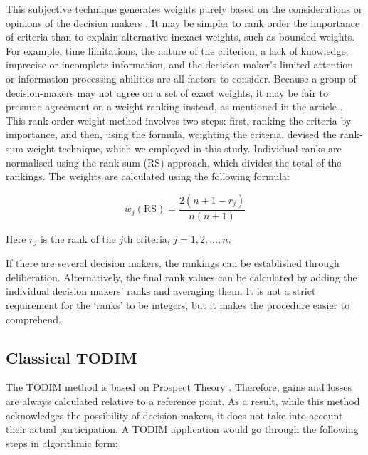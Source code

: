 \documentclass{infor}
\theoremstyle{remark}
\begin{document}
This subjective technique generates weights purely based on the considerations or opinions of the decision makers \citep{zoraghi2013fuzzy}. It may be simpler to rank order the importance of criteria than to explain alternative inexact weights, such as bounded weights. For example, time limitations, the nature of the criterion, a lack of knowledge, imprecise or incomplete information, and the decision maker’s limited attention or information processing abilities are all factors to consider. Because a group of decision-makers may not agree on a set of exact weights, it may be fair to presume agreement on a weight ranking instead, as mentioned in the article \cite{roszkowska2013rank}. This rank order weight method involves two steps: first, ranking the criteria by importance, and then, using the formula, weighting the criteria. \cite{stillwell1981comparison} devised the rank-sum weight technique, which we employed in this study. Individual ranks are normalised using the rank-sum (RS) approach, which divides the total of the rankings. The weights are calculated using the following formula:

\begin{equation}
\label{eqn:rankSumWeights}
w_{j}\left( \text{RS} \right) = \frac{2\left(n + 1 - r_j \right)}{n\left( n + 1 \right)}
\end{equation}

Here \(r_j\) is the rank of the \(j\)th criteria,
\(j = 1, 2, \ldots, n\).

If there are several decision makers, the rankings can be established through deliberation. Alternatively, the final rank values can be calculated by adding the individual decision makers' ranks and averaging them. It is not a strict requirement for the `ranks' to be integers, but it makes the procedure easier to comprehend.
\subsection{Classical TODIM}

The TODIM method is based on Prospect Theory \citep{kahneman2013prospect,gomes2009application, wang2018todim}. Therefore, gains and losses are always calculated relative to a reference point. As a result, while this method acknowledges the possibility of decision makers, it does not take into account their actual participation. A TODIM application would go through the following steps in algorithmic form:
\end{document}

